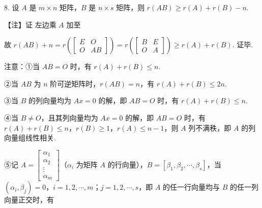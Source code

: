8. 设 $A$ 是 $m\times n$ 矩阵，$B$ 是 $n\times s$ 矩阵，则 $r(AB)\ge r(A)+r(B)-n$.

\begin{fnote}
【注】证 左边乘 $A$ 加至



故 $r(AB)+n=r\left(\begin{bmatrix}E&O\\O&AB\end{bmatrix}\right)=r\left(\begin{bmatrix}B&E\\O&A\end{bmatrix}\right)\ge r(A)+r(B)$. 证毕.

注意：①当 $AB=O$ 时，有 $r(A)+r(B)\le n$.

②当 $AB$ 为 $n$ 阶可逆矩阵时，$r(AB)=n$，有 $r(A)+r(B)\le 2n$.

③当 $B$ 的列向量均为 $Ax=0$ 的解，即 $AB=O$ 时，有 $r(A)+r(B)\le n$.

④当 $B\ne O$，且其列向量均为 $Ax=0$ 的解，即 $AB=O$ 时，有 $r(A)+r(B)\le n$，$r(B)\ge1$，$r(A)\le n-1$，则 $A$ 列不满秩，即 $A$ 的列向量组线性相关.

⑤记 $A=\begin{bmatrix}\alpha_1\\\alpha_2\\\vdots\\\alpha_m\end{bmatrix}$（$\alpha_i$ 为矩阵 $A$ 的行向量），$B=[\beta_1,\beta_2,\cdots,\beta_s]$，当 $(\alpha_i,\beta_j)=0$，$i=1,2,\cdots,m$；$j=1,2,\cdots,s$，即 $A$ 的任一行向量均与 $B$ 的任一列向量正交时，有


\end{fnote}
